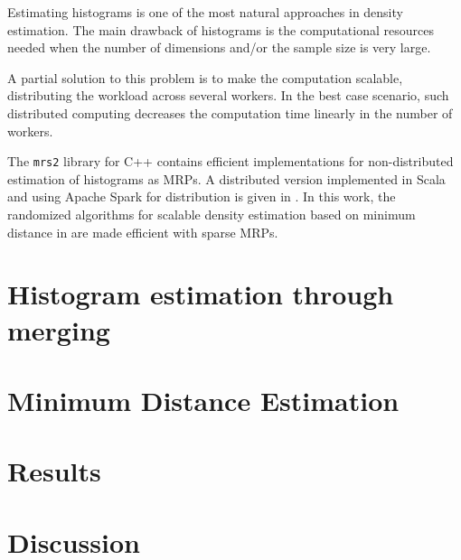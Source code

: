 \documentclass[../main.tex]{subfiles}
\begin{document}
  Estimating histograms is one of the most natural approaches in density estimation.
  The main drawback of histograms is the computational resources needed when 
  the number of dimensions and/or the sample size is very large.

  A partial solution to this problem is to make the computation scalable,
  distributing the workload across several workers.
  In the best case scenario, such distributed computing
  decreases the computation time linearly in the number of workers.
  
  The \verb|mrs2| library for C++ \cite{mrs2,mrp-raaz-harlow-tucker}
  contains efficient implementations for non-distributed estimation of histograms as MRPs.
  A distributed version implemented in Scala and using Apache Spark for distribution
  is given in \cite{scala-density-tree}.
  In this work, the randomized algorithms for scalable density estimation
  based on minimum distance in \cite{srp-mde-raaz-teng}
  are made efficient with sparse MRPs.

  \section{Histogram estimation through merging}
    

  \section{Minimum Distance Estimation}
    

  \section{Results}
    

  \section{Discussion}
    
\end{document}
